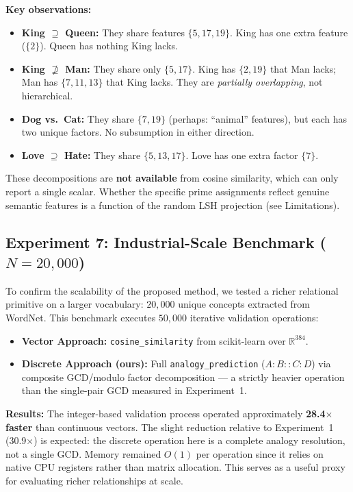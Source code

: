 \documentclass[10pt]{article}
\begin{document}
\noindent\textbf{Key observations:}
\begin{itemize}[nosep, leftmargin=*]
    \item \textbf{King $\supseteq$ Queen:} They share features $\{5,17,19\}$. King has one extra feature ($\{2\}$). Queen has nothing King lacks.
    \item \textbf{King $\not\supseteq$ Man:} They share only $\{5,17\}$. King has $\{2,19\}$ that Man lacks; Man has $\{7,11,13\}$ that King lacks. They are \emph{partially overlapping}, not hierarchical.
    \item \textbf{Dog vs.\ Cat:} They share $\{7,19\}$ (perhaps: ``animal'' features), but each has two unique factors. No subsumption in either direction.
    \item \textbf{Love $\supseteq$ Hate:} They share $\{5,13,17\}$. Love has one extra factor $\{7\}$.
\end{itemize}

These decompositions are \textbf{not available} from cosine similarity, which can only report a single scalar. Whether the specific prime assignments reflect genuine semantic features is a function of the random LSH projection (see Limitations).

\subsection{Experiment 7: Industrial-Scale Benchmark ($N=20{,}000$)}

To confirm the scalability of the proposed method, we tested a richer relational primitive on a larger vocabulary: $20{,}000$ unique concepts extracted from WordNet. This benchmark executes $50{,}000$ iterative validation operations:

\begin{itemize}[nosep, leftmargin=*]
    \item \textbf{Vector Approach:} \texttt{cosine\_similarity} from scikit-learn over $\mathbb{R}^{384}$.
    \item \textbf{Discrete Approach (ours):} Full \texttt{analogy\_prediction} ($A\!:\!B\!::\!C\!:\!D$) via composite GCD/modulo factor decomposition --- a strictly heavier operation than the single-pair GCD measured in Experiment~1.
\end{itemize}

\textbf{Results:} The integer-based validation process operated approximately \textbf{28.4$\times$ faster} than continuous vectors. The slight reduction relative to Experiment~1 (30.9$\times$) is expected: the discrete operation here is a complete analogy resolution, not a single GCD. Memory remained $O(1)$ per operation since it relies on native CPU registers rather than matrix allocation. This serves as a useful proxy for evaluating richer relationships at scale.
\end{document}
